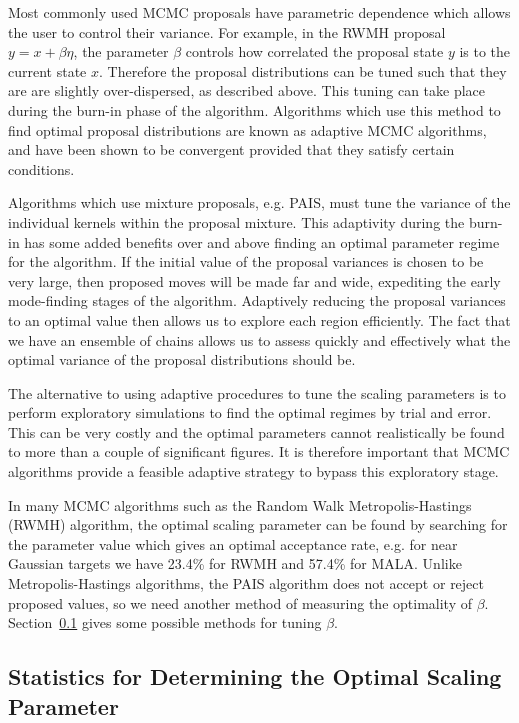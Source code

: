 \documentclass[final]{siamltex}
\begin{document}
Most commonly used MCMC proposals have parametric dependence which
allows the user to control their variance. For example, in the RWMH
proposal $y = x + \beta \eta$, the parameter $\beta$ controls how
correlated the proposal state $y$ is to the current state
$x$. Therefore the proposal distributions can be tuned such that they are are slightly over-dispersed, as described
above. This tuning can take place during the burn-in phase of the
algorithm. Algorithms which use this method to find optimal proposal
distributions are known as adaptive MCMC algorithms, and have been
shown to be convergent provided that they satisfy certain conditions\cite{roberts2007coupling,roberts2009examples}.

Algorithms which use mixture proposals, e.g. PAIS, must tune the
variance of the individual kernels within the proposal mixture. This
adaptivity during the burn-in has some added benefits over and above
finding an optimal parameter regime for the algorithm. If the initial
value of the proposal variances is chosen to be very large, then
proposed moves will be made far and wide, expediting the early
mode-finding stages of the algorithm. Adaptively reducing the proposal variances to an
optimal value then allows us to explore each region efficiently. The
fact that we have an ensemble of chains allows us to assess quickly and
effectively what the optimal variance of the proposal distributions
should be.

The alternative to using adaptive procedures to tune the scaling
parameters is to perform exploratory simulations to find the optimal
regimes by trial and error. This can be very costly and the optimal
parameters cannot realistically be found to more than a couple of
significant figures. It is therefore important that MCMC algorithms
provide a feasible adaptive strategy to bypass this exploratory stage.

In many MCMC algorithms such as the Random Walk Metropolis-Hastings (RWMH) algorithm, the optimal scaling parameter can be found by searching for the parameter value which gives an optimal acceptance rate, e.g. for near Gaussian targets we have 23.4\% for RWMH and 57.4\% for MALA\cite{roberts2001optimal}. Unlike Metropolis-Hastings algorithms, the PAIS algorithm does not accept or reject proposed values, so we need another method of measuring the optimality of $\beta$. Section~\ref{sec:statistics} gives some possible methods for tuning $\beta$.

\subsection{Statistics for Determining the Optimal Scaling Parameter}\label{sec:statistics}
\end{document}
